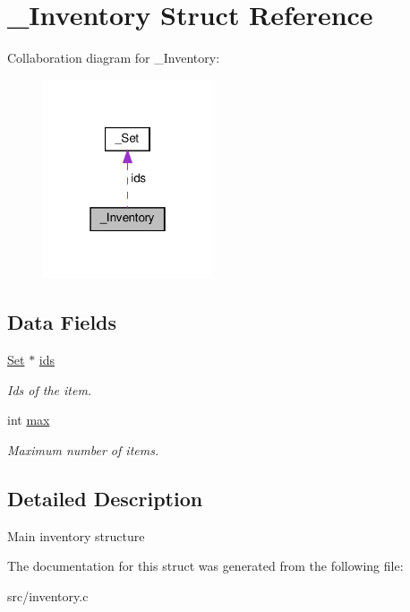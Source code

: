 \hypertarget{struct__Inventory}{}\section{\+\_\+\+Inventory Struct Reference}
\label{struct__Inventory}


Collaboration diagram for \+\_\+\+Inventory\+:\nopagebreak
\begin{figure}[H]
\begin{center}
\leavevmode
\includegraphics[width=142pt]{struct__Inventory__coll__graph}
\end{center}
\end{figure}
\subsection*{Data Fields}
\begin{DoxyCompactItemize}
\item 
\mbox{\label{struct__Inventory_a7f6b5d7d1111e7e8f8999c656ae27d0c}} 
\hyperlink{set_8h_a6d3b7f7c92cbb4577ef3ef7ddbf93161}{Set} $\ast$ \hyperlink{struct__Inventory_a7f6b5d7d1111e7e8f8999c656ae27d0c}{ids}
\begin{DoxyCompactList}\small\item\em Ids of the item. \end{DoxyCompactList}\item 
\mbox{\label{struct__Inventory_ac09bcf212b2c7ff348066b2e5f28bb9c}} 
int \hyperlink{struct__Inventory_ac09bcf212b2c7ff348066b2e5f28bb9c}{max}
\begin{DoxyCompactList}\small\item\em Maximum number of items. \end{DoxyCompactList}\end{DoxyCompactItemize}


\subsection{Detailed Description}
Main inventory structure 

The documentation for this struct was generated from the following file\+:\begin{DoxyCompactItemize}
\item 
src/inventory.\+c\end{DoxyCompactItemize}
